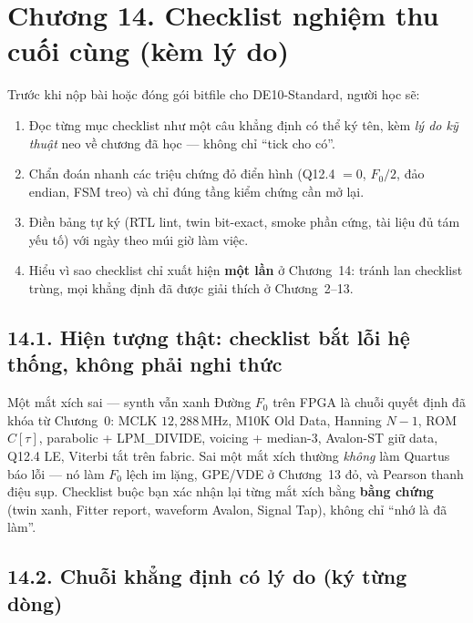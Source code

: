 \clearpage
{}
\section*{Chương 14. Checklist nghiệm thu cuối cùng (kèm lý do)}

\begin{learningobj}
Trước khi nộp bài hoặc đóng gói bitfile cho DE10-Standard, người học sẽ:
\begin{enumerate}[leftmargin=1.4em]
    \item Đọc từng mục checklist như một câu khẳng định có thể ký tên, kèm \emph{lý do kỹ thuật} neo về chương đã học --- không chỉ ``tick cho có''.
    \item Chẩn đoán nhanh các triệu chứng đỏ điển hình (Q12.4 $=0$, $F_0/2$, đảo endian, FSM treo) và chỉ đúng tầng kiểm chứng cần mở lại.
    \item Điền bảng tự ký (RTL lint, twin bit-exact, smoke phần cứng, tài liệu đủ tám yếu tố) với ngày theo múi giờ làm việc.
    \item Hiểu vì sao checklist chỉ xuất hiện \textbf{một lần} ở Chương~14: tránh lan checklist trùng, mọi khẳng định đã được giải thích ở Chương~2--13.
\end{enumerate}
\end{learningobj}

\subsection*{14.1. Hiện tượng thật: checklist bắt lỗi hệ thống, không phải nghi thức}

\begin{firstprin}{Một mắt xích sai --- synth vẫn xanh}
Đường $F_0$ trên FPGA là chuỗi quyết định đã khóa từ Chương~0: MCLK $12{,}288\,\text{MHz}$, M10K Old Data, Hanning $N-1$, ROM $C[\tau]$, parabolic + LPM\_DIVIDE, voicing + median-3, Avalon-ST giữ data, Q12.4 LE, Viterbi tắt trên fabric. Sai một mắt xích thường \emph{không} làm Quartus báo lỗi --- nó làm $F_0$ lệch im lặng, GPE/VDE ở Chương~13 đỏ, và Pearson thanh điệu sụp. Checklist buộc bạn xác nhận lại từng mắt xích bằng \textbf{bằng chứng} (twin xanh, Fitter report, waveform Avalon, Signal Tap), không chỉ ``nhớ là đã làm''.
\end{firstprin}

\subsection*{14.2. Chuỗi khẳng định có lý do (ký từng dòng)}

